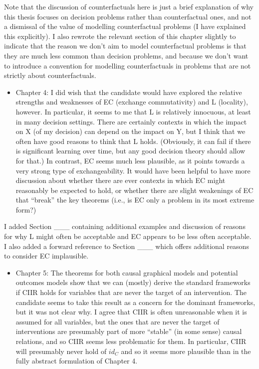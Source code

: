 Note that the discussion of counterfactuals here is just a brief explanation of why this thesis focuses on decision problems rather than counterfactual ones, and not a dismissal of the value of modelling counterfactual problems (I have explained this explicitly). I also rewrote the relevant section of this chapter slightly to indicate that the reason we don't aim to model counterfactual problems is that they are much less common than decision problems, and because we don't want to introduce a convention for modelling counterfactuals in problems that are not strictly about counterfactuals.

\begin{itemize}
    \item Chapter 4: I did wish that the candidate would have explored the relative strengths and weaknesses of EC (exchange commutativity) and L (locality), however. In particular, it seems to me that L is relatively innocuous, at least in many decision settings. There are certainly contexts in which the impact on X (of my decision) can depend on the impact on Y, but I think that we often have good reasons to think that L holds. (Obviously, it can fail if there is significant learning over time, but any good decision theory should allow for that.) In contrast, EC seems much less plausible, as it points towards a very strong type of exchangeability. It would have been helpful to have more discussion about whether there are ever contexts in which EC might reasonably be expected to hold, or whether there are slight weakenings of EC that “break” the key theorems (i.e., is EC only a problem in its most extreme form?)
\end{itemize}

I added Section ___ containing additional examples and discussion of reasons for why L might often be acceptable and EC appears to be less often acceptable. I also added a forward reference to Section ___ which offers additional reasons to consider EC implausible.


\begin{itemize}
    \item Chapter 5: The theorems for both causal graphical models and potential outcomes models show that we can (mostly) derive the standard frameworks if CIIR holds for variables that are never the target of an intervention. The candidate seems to take this result as a concern for the dominant frameworks, but it was not clear why. I agree that CIIR is often unreasonable when it is assumed for all variables, but the ones that are never the target of interventions are presumably part of more “stable” (in some sense) causal relations, and so CIIR seems less problematic for them. In particular, CIIR will presumably never hold of $id_C$ and so it seems more plausible than in the fully abstract formulation of Chapter 4.
\end{itemize}


